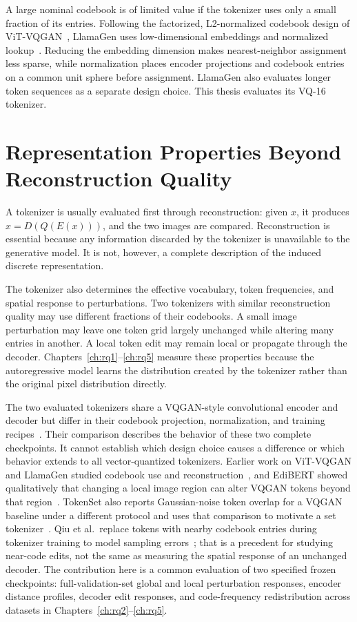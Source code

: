 A large nominal codebook is of limited value if the tokenizer uses only a small
fraction of its entries. Following the factorized, L2-normalized codebook
design of ViT-VQGAN~\cite{yu2021vector}, LlamaGen uses low-dimensional
embeddings and normalized lookup~\cite{sun2024llamagen}. Reducing
the embedding dimension makes nearest-neighbor assignment less sparse, while
normalization places encoder projections and codebook entries on a common unit
sphere before assignment. LlamaGen also evaluates longer token sequences as a
separate design choice. This thesis evaluates its VQ-16 tokenizer.

\section{Representation Properties Beyond Reconstruction Quality}
\label{sec:reconstruction_to_behavior}

A tokenizer is usually evaluated first through reconstruction: given $x$, it produces
$\hat{x}=D(Q(E(x)))$, and the two images are compared. Reconstruction is essential because any information discarded by the tokenizer is unavailable to the generative model. It is not, however, a complete description of the induced discrete representation.

The tokenizer also determines the effective vocabulary, token frequencies, and
spatial response to perturbations. Two tokenizers with similar reconstruction
quality may use different fractions of their codebooks. A small image
perturbation may leave one token grid largely unchanged while altering many
entries in another. A local token edit may remain local or propagate through
the decoder. Chapters~\ref{ch:rq1}--\ref{ch:rq5} measure these
properties because the autoregressive model learns the distribution created by
the tokenizer rather than the original pixel distribution directly.

The two evaluated tokenizers share a VQGAN-style convolutional encoder and
decoder but differ in their codebook projection, normalization, and training
recipes~\cite{esser2021taming,sun2024llamagen}. Their comparison describes
the behavior of these two complete checkpoints. It cannot establish which
design choice causes a difference or which behavior extends to all
vector-quantized tokenizers. Earlier work on ViT-VQGAN and LlamaGen studied
codebook use and reconstruction~\cite{yu2021vector,sun2024llamagen}, and
EdiBERT showed qualitatively that changing a local image region can alter
VQGAN tokens beyond that region~\cite{issenhuth2021edibert}. TokenSet also reports
Gaussian-noise token overlap for a VQGAN baseline under a different protocol
and uses that comparison to motivate a set tokenizer~\cite{geng2025tokenize}.
Qiu et al.\ replace tokens with nearby codebook entries during tokenizer
training to model sampling errors~\cite{qiu2025imagetokenizer}; that is a
precedent for studying near-code edits, not the same as measuring the spatial
response of an unchanged decoder. The contribution here is a common evaluation of
two specified frozen checkpoints: full-validation-set global and local
perturbation responses, encoder distance profiles, decoder edit responses,
and code-frequency redistribution across datasets in
Chapters~\ref{ch:rq2}--\ref{ch:rq5}.
